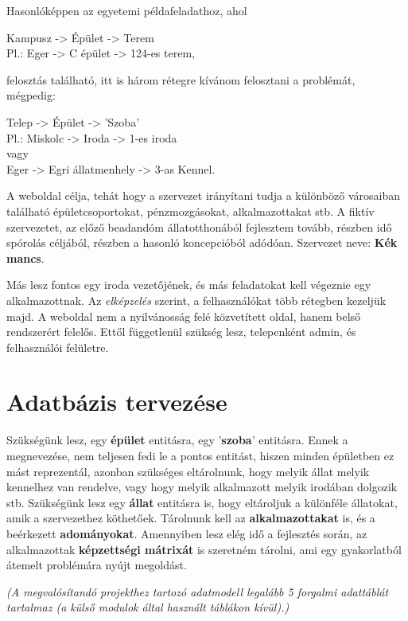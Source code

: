\documentclass[a4paper,12pt]{article}
\begin{document}
Hasonlóképpen az egyetemi példafeladathoz, ahol
\begin{center}
	Kampusz -> Épület -> Terem \\[0.5cm]
	Pl.: Eger -> C épület -> 124-es terem,
\end{center}
felosztás található, itt is három rétegre kívánom felosztani a problémát, mégpedig:
\begin{center}
	Telep -> Épület -> 'Szoba'\\[0.5cm]
	Pl.: Miskolc -> Iroda -> 1-es iroda\\
	vagy\\
	Eger -> Egri állatmenhely -> 3-as Kennel.
\end{center}

A weboldal célja, tehát hogy a szervezet irányítani tudja a különböző városaiban található épületcsoportokat, pénzmozgásokat, alkalmazottakat stb.
A fiktív szervezetet, az előző beadandóm állatotthonából fejlesztem tovább, részben idő spórolás céljából, részben a hasonló koncepcióból adódóan.
 Szervezet neve: \textbf{Kék mancs}.

Más lesz fontos egy iroda vezetőjének, és más feladatokat kell végeznie egy alkalmazottnak. Az \textit{elképzelés} szerint, a felhasználókat több rétegben kezeljük majd. A weboldal nem a nyilvánosság felé közvetített oldal, hanem belső rendszerért felelős. Ettől függetlenül szükség lesz, telepenként admin, és felhasználói felületre. 


\section{Adatbázis tervezése}

Szükségünk lesz, egy \textbf{épület} entitásra, egy '\textbf{szoba}' entitásra. Ennek a megnevezése, nem teljesen fedi le a pontos entitást, hiszen minden épületben ez mást reprezentál, azonban szükséges eltárolnunk, hogy melyik állat melyik kennelhez van rendelve, vagy hogy melyik alkalmazott melyik irodában dolgozik stb. Szükségünk lesz egy \textbf{állat} entitásra is, hogy eltároljuk a különféle állatokat, amik a szervezethez köthetőek. Tárolnunk kell az \textbf{alkalmazottakat} is, és a beérkezett \textbf{adományokat}. Amennyiben lesz elég idő a fejlesztés során, az alkalmazottak \textbf{képzettségi mátrixát} is szeretném tárolni, ami egy gyakorlatból átemelt problémára nyújt megoldást.

\begin{center}
	\textit{{\footnotesize (A megvalósítandó projekthez tartozó adatmodell legalább 5 forgalmi adattáblát tartalmaz (a külső modulok által használt táblákon kívül).)}}
\end{center}
\end{document}
